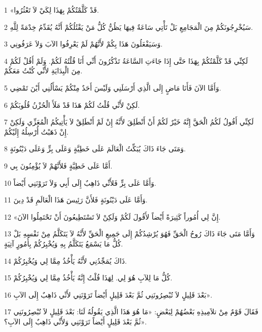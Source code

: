 \par 1 «قَدْ كَلَّمْتُكُمْ بِهَذَا لِكَيْ لاَ تَعْثُرُوا.
\par 2 سَيُخْرِجُونَكُمْ مِنَ الْمَجَامِعِ بَلْ تَأْتِي سَاعَةٌ فِيهَا يَظُنُّ كُلُّ مَنْ يَقْتُلُكُمْ أَنَّهُ يُقَدِّمُ خِدْمَةً لِلَّهِ.
\par 3 وَسَيَفْعَلُونَ هَذَا بِكُمْ لأَنَّهُمْ لَمْ يَعْرِفُوا الآبَ وَلاَ عَرَفُونِي.
\par 4 لَكِنِّي قَدْ كَلَّمْتُكُمْ بِهَذَا حَتَّى إِذَا جَاءَتِ السَّاعَةُ تَذْكُرُونَ أَنِّي أَنَا قُلْتُهُ لَكُمْ. وَلَمْ أَقُلْ لَكُمْ مِنَ الْبِدَايَةِ لأَنِّي كُنْتُ مَعَكُمْ.
\par 5 وَأَمَّا الآنَ فَأَنَا مَاضٍ إِلَى الَّذِي أَرْسَلَنِي وَلَيْسَ أَحَدٌ مِنْكُمْ يَسْأَلُنِي أَيْنَ تَمْضِي.
\par 6 لَكِنْ لأَنِّي قُلْتُ لَكُمْ هَذَا قَدْ مَلَأَ الْحُزْنُ قُلُوبَكُمْ.
\par 7 لَكِنِّي أَقُولُ لَكُمُ الْحَقَّ إِنَّهُ خَيْرٌ لَكُمْ أَنْ أَنْطَلِقَ لأَنَّهُ إِنْ لَمْ أَنْطَلِقْ لاَ يَأْتِيكُمُ الْمُعَزِّي وَلَكِنْ إِنْ ذَهَبْتُ أُرْسِلُهُ إِلَيْكُمْ.
\par 8 وَمَتَى جَاءَ ذَاكَ يُبَكِّتُ الْعَالَمَ عَلَى خَطِيَّةٍ وَعَلَى بِرٍّ وَعَلَى دَيْنُونَةٍ.
\par 9 أَمَّا عَلَى خَطِيَّةٍ فَلأَنَّهُمْ لاَ يُؤْمِنُونَ بِي.
\par 10 وَأَمَّا عَلَى بِرٍّ فَلأَنِّي ذَاهِبٌ إِلَى أَبِي وَلاَ تَرَوْنَنِي أَيْضاً.
\par 11 وَأَمَّا عَلَى دَيْنُونَةٍ فَلأَنَّ رَئِيسَ هَذَا الْعَالَمِ قَدْ دِينَ.
\par 12 «إِنَّ لِي أُمُوراً كَثِيرَةً أَيْضاً لأَقُولَ لَكُمْ وَلَكِنْ لاَ تَسْتَطِيعُونَ أَنْ تَحْتَمِلُوا الآنَ.
\par 13 وَأَمَّا مَتَى جَاءَ ذَاكَ رُوحُ الْحَقِّ فَهُوَ يُرْشِدُكُمْ إِلَى جَمِيعِ الْحَقِّ لأَنَّهُ لاَ يَتَكَلَّمُ مِنْ نَفْسِهِ بَلْ كُلُّ مَا يَسْمَعُ يَتَكَلَّمُ بِهِ وَيُخْبِرُكُمْ بِأُمُورٍ آتِيَةٍ.
\par 14 ذَاكَ يُمَجِّدُنِي لأَنَّهُ يَأْخُذُ مِمَّا لِي وَيُخْبِرُكُمْ.
\par 15 كُلُّ مَا لِلآبِ هُوَ لِي. لِهَذَا قُلْتُ إِنَّهُ يَأْخُذُ مِمَّا لِي وَيُخْبِرُكُمْ.
\par 16 بَعْدَ قَلِيلٍ لاَ تُبْصِرُونَنِي ثُمَّ بَعْدَ قَلِيلٍ أَيْضاً تَرَوْنَنِي لأَنِّي ذَاهِبٌ إِلَى الآبِ».
\par 17 فَقَالَ قَوْمٌ مِنْ تلاَمِيذِهِ بَعْضُهُمْ لِبَعْضٍ: «مَا هُوَ هَذَا الَّذِي يَقُولُهُ لَنَا: بَعْدَ قَلِيلٍ لاَ تُبْصِرُونَنِي ثُمَّ بَعْدَ قَلِيلٍ أَيْضاً تَرَوْنَنِي وَلأَنِّي ذَاهِبٌ إِلَى الآبِ؟».
